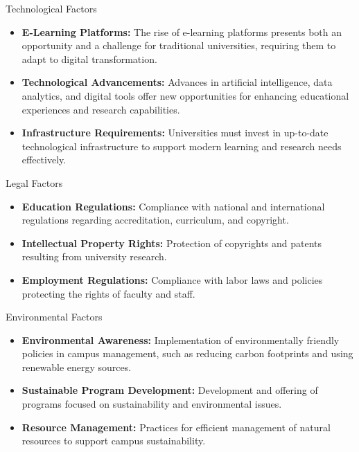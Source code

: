 \documentclass[aspectratio=169, table]{beamer}
\begin{document}
\begin{frame}{Technological Factors}
	\begin{itemize}
		\item \textbf{E-Learning Platforms:} The rise of e-learning platforms presents both an opportunity and a challenge for traditional universities, requiring them to adapt to digital transformation.
		\item \textbf{Technological Advancements:} Advances in artificial intelligence, data analytics, and digital tools offer new opportunities for enhancing educational experiences and research capabilities.
		\item \textbf{Infrastructure Requirements:} Universities must invest in up-to-date technological infrastructure to support modern learning and research needs effectively.
	\end{itemize}
\end{frame}

\begin{frame}{Legal Factors}
	\begin{itemize}
		\item \textbf{Education Regulations:} Compliance with national and international regulations regarding accreditation, curriculum, and copyright.
		\item \textbf{Intellectual Property Rights:} Protection of copyrights and patents resulting from university research.
		\item \textbf{Employment Regulations:} Compliance with labor laws and policies protecting the rights of faculty and staff.
	\end{itemize}
\end{frame}

\begin{frame}{Environmental Factors}
	\begin{itemize}
		\item \textbf{Environmental Awareness:} Implementation of environmentally friendly policies in campus management, such as reducing carbon footprints and using renewable energy sources.
		\item \textbf{Sustainable Program Development:} Development and offering of programs focused on sustainability and environmental issues.
		\item \textbf{Resource Management:} Practices for efficient management of natural resources to support campus sustainability.
	\end{itemize}
\end{frame}
\end{document}
